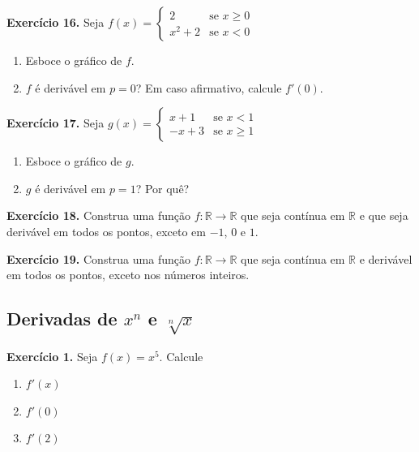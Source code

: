 \documentclass[12pt,a4paper]{article}
\begin{document}
\vspace{0.5cm}
\noindent\textbf{Exercício 16.} Seja $f(x) = \begin{cases} 2 & \text{se } x \geq 0 \\ x^2 + 2 & \text{se } x < 0 \end{cases}$
\begin{enumerate}
    \renewcommand{\theenumi}{\alph{enumi}}
    \renewcommand{\labelenumi}{\theenumi)}
    \item Esboce o gráfico de $f$.
    \item $f$ é derivável em $p = 0$? Em caso afirmativo, calcule $f'(0)$.
\end{enumerate}

\vspace{0.5cm}
\noindent\textbf{Exercício 17.} Seja $g(x) = \begin{cases} x + 1 & \text{se } x < 1 \\ -x + 3 & \text{se } x \geq 1 \end{cases}$
\begin{enumerate}
    \renewcommand{\theenumi}{\alph{enumi}}
    \renewcommand{\labelenumi}{\theenumi)}
    \item Esboce o gráfico de $g$.
    \item $g$ é derivável em $p = 1$? Por quê?
\end{enumerate}

\vspace{0.5cm}
\noindent\textbf{Exercício 18.}
Construa uma função $f\colon \mathbb{R} \to \mathbb{R}$ que seja contínua em $\mathbb{R}$ e que seja derivável em todos os pontos, exceto em $-1$, $0$ e $1$.

\vspace{0.5cm}
\noindent\textbf{Exercício 19.}
Construa uma função $f\colon \mathbb{R} \to \mathbb{R}$ que seja contínua em $\mathbb{R}$ e derivável em todos os pontos, exceto nos números inteiros.

\subsection{Derivadas de $x^n$ e $\sqrt[n]{x}$}
\vspace{0.5cm}
\noindent\textbf{Exercício 1.} Seja $f(x) = x^5$. Calcule
\begin{enumerate}
    \renewcommand{\theenumi}{\alph{enumi}}
    \renewcommand{\labelenumi}{\theenumi)}
    \item $f'(x)$
    \item $f'(0)$
    \item $f'(2)$
\end{enumerate}
\end{document}
